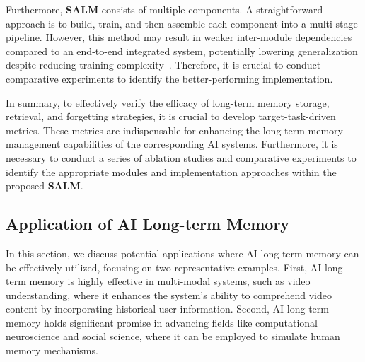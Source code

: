 \documentclass[journal,hideappendix]{vgtc}
\begin{document}
Furthermore, \textbf{SALM} consists of multiple components. A straightforward approach is to build, train, and then assemble each component into a multi-stage pipeline. However, this method may result in weaker inter-module dependencies compared to an end-to-end integrated system, potentially lowering generalization despite reducing training complexity~\cite{sukhbaatar2015end,glasmachers2017limits}. Therefore, it is crucial to conduct comparative experiments to identify the better-performing implementation.

In summary, to effectively verify the efficacy of long-term memory storage, retrieval, and forgetting strategies, it is crucial to develop target-task-driven metrics. These metrics are indispensable for enhancing the long-term memory management capabilities of the corresponding AI systems. Furthermore, it is necessary to conduct a series of ablation studies and comparative experiments to identify the appropriate modules and implementation approaches within the proposed \textbf{SALM}.

\subsection{Application of AI Long-term Memory}
\label{sec:next_steps:application}

In this section, we discuss potential applications where AI long-term memory can be effectively utilized, focusing on two representative examples. 
First, AI long-term memory is highly effective in multi-modal systems, such as video understanding, where it enhances the system's ability to comprehend video content by incorporating historical user information. 
Second, AI long-term memory holds significant promise in advancing fields like computational neuroscience and social science, where it can be employed to simulate human memory mechanisms.
\end{document}
